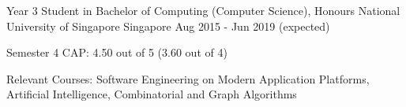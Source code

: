 

\begin{cventries}

  \cventry
  {Year 3 Student in Bachelor of Computing (Computer Science), Honours} %
  {National University of Singapore} %
  {Singapore} %
  {Aug 2015 - Jun 2019 (expected)} %
  {
    \begin{cvitems} %
    \item {Semester 4 CAP: 4.50 out of 5 (3.60 out of 4)}
    \item {Relevant Courses: Software Engineering on Modern Application Platforms, Artificial Intelligence, Combinatorial and Graph Algorithms}
    \end{cvitems}
  }

\end{cventries}
